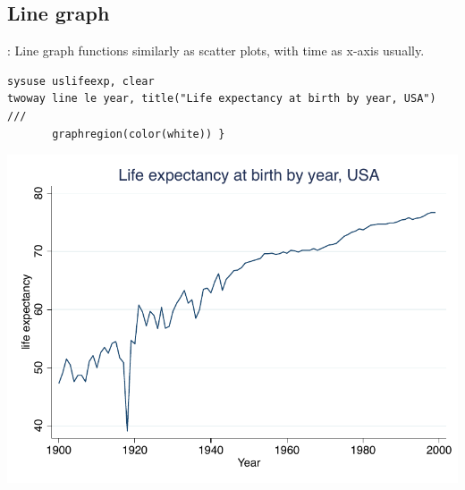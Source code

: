 \subsection{Line graph}
\begin{frame}[fragile]{\secname: \subsecname}
Line graph functions similarly as scatter plots, with time as x-axis usually.
\small
\begin{verbatim}
sysuse uslifeexp, clear
twoway line le year, title("Life expectancy at birth by year, USA") ///
       graphregion(color(white)) }
\end{verbatim}
\begin{center}
	\includegraphics[scale=0.5]{images/line}
\end{center}
\end{frame}


